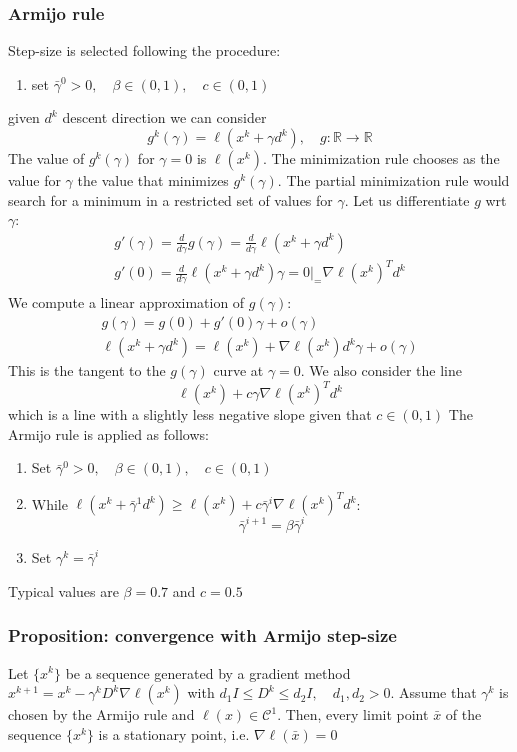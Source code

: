 \documentclass{book}
\newcommand\at[2]{\left.#1\right|_{#2}}
\newcommand{\R}{\mathbb{R}}
\theoremstyle{definition}
\theoremstyle{remark}
\theoremstyle{remark}
\begin{document}
\subsubsection{Armijo rule}
Step-size is selected following the procedure: 
\begin{enumerate}
    \item set $\bar{\gamma}^0>0,\quad \beta\in(0,1),\quad c\in(0,1)$
\end{enumerate}
given $d^k$ descent direction we can consider 
\[
    g^k(\gamma) = \ell(x^k+\gamma d^k), \quad g:\R\to\R
\]
The value of $g^k(\gamma)$ for $\gamma=0$ is $\ell(x^k)$. The minimization rule chooses as the value for $\gamma$ the value that minimizes $g^k(\gamma)$. The partial minimization rule would search for a minimum in a restricted set of values for $\gamma$. Let us differentiate $g$ wrt $\gamma$:
\begin{gather*}
    g'(\gamma)=\displaystyle\frac{d}{d\gamma}g(\gamma)=\displaystyle\frac{d}{d\gamma}\ell(x^k+\gamma d^k)\\
    g'(0) = \displaystyle\frac{d}{d\gamma}\ell(x^k+\gamma d^k)\at{\gamma=0} = \nabla \ell(x^k)^Td^k\\
\end{gather*}
We compute a linear approximation of $g(\gamma)$:
\begin{gather*}
    g(\gamma) = g(0) + g'(0)\gamma+o(\gamma)\\
    \ell(x^k+\gamma d^k) = \ell(x^k)+\nabla\ell(x^k)d^k \gamma + o(\gamma)
\end{gather*}
This is the tangent to the $g(\gamma)$ curve at $\gamma=0$. We also consider the line 
\[
    \ell(x^k)+c\gamma\nabla\ell(x^k)^Td^k
\]
which is a line with a slightly less negative slope given that $c\in(0,1)$
The Armijo rule is applied as follows: 
\begin{enumerate}
    \item Set $\bar{\gamma}^0>0,\quad\beta\in(0,1),\quad c\in(0,1)$
    \item While $\ell(x^k+\bar{\gamma}^1d^k)\geq \ell(x^k)+c\bar{\gamma}^i\nabla\ell(x^k)^Td^k$:
        \[
            \bar{\gamma}^{i+1}=\beta\bar{\gamma}^i
        \]
    \item Set $\gamma^k = \bar{\gamma}^i$
\end{enumerate}
Typical values are $\beta=0.7$ and $c=0.5$

\subsubsection{Proposition: convergence with Armijo step-size}
Let $\{x^k\}$ be a sequence generated by a gradient method $x^{k+1}=x^k-\gamma^kD^k\nabla\ell(x^k)$ with $d_1I\leq D^k \leq d_2I, \quad d_1,d_2>0$. Assume that $\gamma^k$ is chosen by the Armijo rule and $\ell(x)\in \mathcal{C}^1$. Then, every limit point $\bar{x}$ of the sequence $\{x^k\}$ is a stationary point, i.e. $\nabla\ell(\bar{x})=0$
\end{document}
